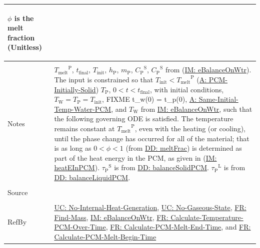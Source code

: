 \documentclass[12pt]{article}
\begin{document}
\begin{minipage}{\textwidth}
\begin{tabular}{>{\raggedright}p{}>{\raggedright\arraybackslash}p{}}
\begin{symbDescription}
              \item{$ϕ$ is the melt fraction (Unitless)}
              \end{symbDescription}
\\ \midrule \\
Notes & ${{T_{\text{melt}}}^{\text{P}}}$, ${t_{\text{final}}}$, ${T_{\text{init}}}$, ${h_{\text{P}}}$, ${m_{\text{P}}}$, ${{C_{\text{P}}}^{\text{S}}}$, ${{C_{\text{P}}}^{\text{S}}}$ from (\hyperref[IM:eBalanceOnWtr]{IM: eBalanceOnWtr}). The input is constrained so that ${T_{\text{init}}}<{{T_{\text{melt}}}^{\text{P}}}$ (\hyperref[assumpPIS]{A: PCM-Initially-Solid}) ${T_{\text{P}}}$, $0<t<{t_{\text{final}}}$, with initial conditions, ${T_{\text{W}}}={T_{\text{P}}}={T_{\text{init}}}$, FIXME t\_w(0) = t\_p(0), \hyperref[assumpSITWP]{A: Same-Initial-Temp-Water-PCM}, and ${T_{\text{W}}}$ from \hyperref[IM:eBalanceOnWtr]{IM: eBalanceOnWtr}, such that the following governing ODE is satisfied. The temperature remains constant at ${{T_{\text{melt}}}^{\text{P}}}$, even with the heating (or cooling), until the phase change has occurred for all of the material; that is as long as $0<ϕ<1$ (from \hyperref[DD:meltFrac]{DD: meltFrac}) is determined as part of the heat energy in the PCM, as given in (\hyperref[IM:heatEInPCM]{IM: heatEInPCM}). ${{τ_{\text{P}}}^{\text{S}}}$ is from \hyperref[DD:balanceSolidPCM]{DD: balanceSolidPCM}. ${{τ_{\text{P}}}^{\text{L}}}$ is from \hyperref[DD:balanceLiquidPCM]{DD: balanceLiquidPCM}.
        
\\ \midrule \\
Source & \cite{koothoor2013}
         
\\ \midrule \\
RefBy & \hyperref[unlikeChgNIHG]{UC: No-Internal-Heat-Generation}, \hyperref[unlikeChgNGS]{UC: No-Gaseous-State}, \hyperref[findMass]{FR: Find-Mass}, \hyperref[IM:eBalanceOnWtr]{IM: eBalanceOnWtr}, \hyperref[calcTempPCMOverTime]{FR: Calculate-Temperature-PCM-Over-Time}, \hyperref[calcPCMMeltEnd]{FR: Calculate-PCM-Melt-End-Time}, and \hyperref[calcPCMMeltBegin]{FR: Calculate-PCM-Melt-Begin-Time}
        
\\ \bottomrule
\end{tabular}
\end{minipage}
\end{document}
